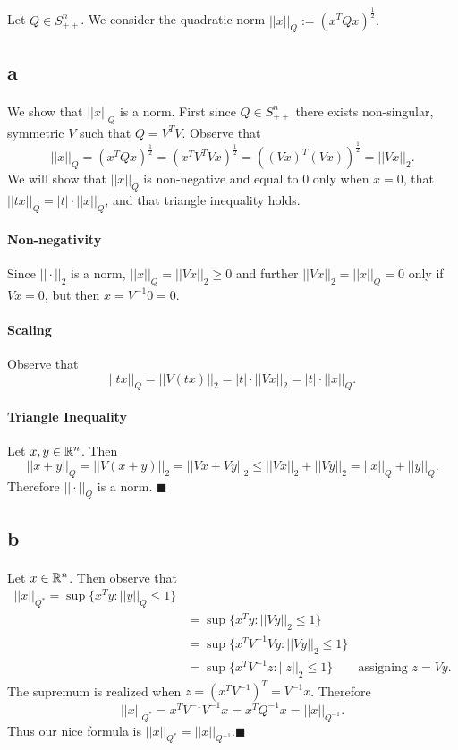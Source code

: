 \documentclass[letterpaper,12pt,oneside,onecolumn]{article}
\begin{document}
\section{}
Let $Q \in S^n_{++}$. We consider the quadratic norm $||x||_Q := (x^TQx)^\frac{1}{2}.$
\subsection{a}
\paragraph{}
We show that $||x||_Q$ is a norm. First since $Q\in S^n_{++}$ there exists non-singular, symmetric $V$ such that $Q = V^TV$. Observe that
$$||x||_Q = (x^TQx)^\frac{1}{2} = (x^TV^TVx)^\frac{1}{2} =  ((Vx)^T(Vx))^\frac{1}{2} = ||Vx||_2.$$
We will show that $||x||_Q$ is non-negative and equal to $0$ only when $x = 0$, that $||t x||_Q = |t|\cdot ||x||_Q$, and that triangle inequality holds.
\paragraph{Non-negativity}
Since $||\cdot||_2$ is a norm, $||x||_Q = ||Vx||_2 \geq 0$ and further $||Vx||_2 = ||x||_Q = 0$ only if $Vx = 0$, but then $x = V^{-1}0 = 0$.
\paragraph{Scaling}
Observe that $$||tx||_Q = ||V(tx)||_2 = |t|\cdot ||Vx||_2 = |t|\cdot ||x||_Q.$$
\paragraph{Triangle Inequality}
Let $x,y \in \mathbb{R}^n$. Then
$$||x+y||_Q = ||V(x+y)||_2 = ||Vx + Vy||_2 \leq ||Vx||_2 + ||Vy||_2 = ||x||_Q + ||y||_Q.$$
Therefore $||\cdot||_Q$ is a norm. $\blacksquare$
\subsection{b}
\paragraph{}
Let $x \in \mathbb{R}^n$. Then observe that
\begin{align*}
||x||_{Q^*} = \sup \{ x^Ty : ||y||_Q \leq 1\} \\
&= \sup \{x^Ty : ||Vy||_2 \leq 1\} \\
&= \sup \{x^TV^{-1}Vy : ||Vy||_2 \leq 1\} \\
&= \sup\{x^TV^{-1}z : ||z||_2 \leq 1\} &\text{assigning $z=Vy$}. 
\end{align*}
The supremum is realized when $z = (x^TV^{-1})^T = V^{-1}x$. Therefore
$$||x||_{Q^*} = x^TV^{-1}V^{-1}x = x^TQ^{-1}x = ||x||_{Q^{-1}}.$$
Thus our nice formula is $||x||_{Q^*} = ||x||_{Q^{-1}}$.$\blacksquare$
\end{document}
